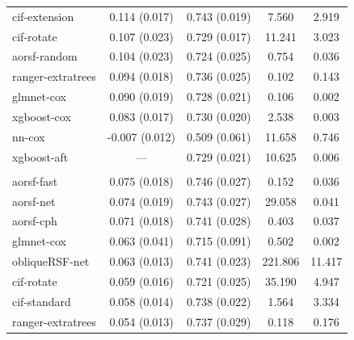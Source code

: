\documentclass{article}\usepackage[]{graphicx}\usepackage[]{xcolor}
\newenvironment{knitrout}{}{} %
\begin{document}
\begin{knitrout}
\begin{longtable}[t]{lcccc}
\hspace{1em}cif-extension & 0.114 (0.017) & 0.743 (0.019) & 7.560 & 2.919\\
\hspace{1em}cif-rotate & 0.107 (0.023) & 0.729 (0.017) & 11.241 & 3.023\\
\hspace{1em}aorsf-random & 0.104 (0.023) & 0.724 (0.025) & 0.754 & 0.036\\
\hspace{1em}ranger-extratrees & 0.094 (0.018) & 0.736 (0.025) & 0.102 & 0.143\\
\hspace{1em}glmnet-cox & 0.090 (0.019) & 0.728 (0.021) & 0.106 & 0.002\\
\hspace{1em}xgboost-cox & 0.083 (0.017) & 0.730 (0.020) & 2.538 & 0.003\\
\hspace{1em}nn-cox & -0.007 (0.012) & 0.509 (0.061) & 11.658 & 0.746\\
\hspace{1em}xgboost-aft & --- & 0.729 (0.021) & 10.625 & 0.006\\
\addlinespace[0.3em]
\multicolumn{5}{l}{\textit{\textbf{GUIDE-IT; CVD death, n = 894, p = 59}}}\\
\hline
\hspace{1em}aorsf-fast & 0.075 (0.018) & 0.746 (0.027) & 0.152 & 0.036\\
\hspace{1em}aorsf-net & 0.074 (0.019) & 0.743 (0.027) & 29.058 & 0.041\\
\hspace{1em}aorsf-cph & 0.071 (0.018) & 0.741 (0.028) & 0.403 & 0.037\\
\hspace{1em}glmnet-cox & 0.063 (0.041) & 0.715 (0.091) & 0.502 & 0.002\\
\hspace{1em}obliqueRSF-net & 0.063 (0.013) & 0.741 (0.023) & 221.806 & 11.417\\
\hspace{1em}cif-rotate & 0.059 (0.016) & 0.721 (0.025) & 35.190 & 4.947\\
\hspace{1em}cif-standard & 0.058 (0.014) & 0.738 (0.022) & 1.564 & 3.334\\
\hspace{1em}ranger-extratrees & 0.054 (0.013) & 0.737 (0.029) & 0.118 & 0.176\\

\end{longtable}
\end{knitrout}
\end{document}
